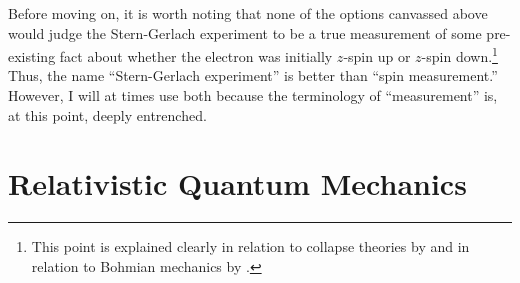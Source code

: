 \documentclass[12pt,secnumarabic,amsmath,amssymb,balancelastpage,nofootinbib]{article}
\begin{document}
Before moving on, it is worth noting that none of the options canvassed above would judge the Stern-Gerlach experiment to be a true measurement of some pre-existing fact about whether the electron was initially $z$-spin up or $z$-spin down.\footnote{This point is explained clearly in relation to collapse theories by \citet[pg.\ 101--102]{maudlinQM} and in relation to Bohmian mechanics by \citet{norsen2014}.}  Thus, the name ``Stern-Gerlach experiment'' is better than ``spin measurement.''  However, I will at times use both because the terminology of ``measurement'' is, at this point, deeply entrenched.











\section{Relativistic Quantum Mechanics}\label{rqmsection}
\end{document}

